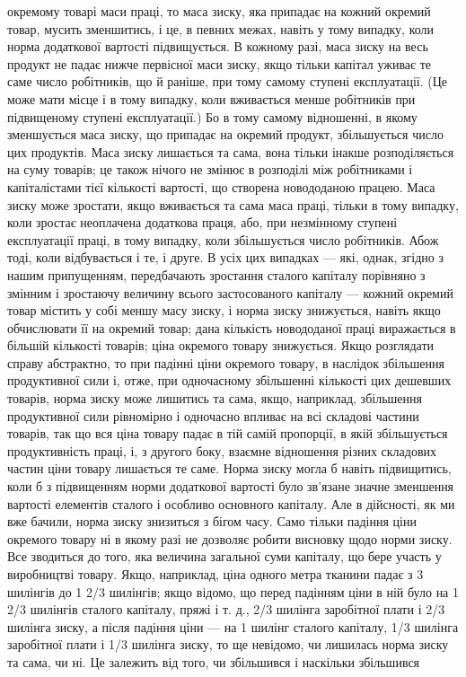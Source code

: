 \parcont{}  %
окремому товарі маси праці, то маса зиску, яка припадає на кожний окремий товар, мусить зменшитись,
і це, в певних межах, навіть у тому випадку, коли норма додаткової вартості підвищується. В кожному
разі, маса зиску на весь продукт не падає нижче первісної маси зиску, якщо тільки капітал уживає те
саме число робітників, що й раніше, при тому самому ступені експлуатації. (Це може мати місце і в
тому випадку, коли вживається менше робітників при підвищеному ступені експлуатації.) Бо в тому
самому відношенні, в якому зменшується маса зиску, що припадає на окремий продукт, збільшується
число цих продуктів. Маса зиску лишається та сама, вона тільки інакше розподіляється на суму
товарів; це також нічого не змінює в розподілі між робітниками і капіталістами тієї кількості
вартості, що створена новододаною працею. Маса зиску може зростати, якщо вживається та сама маса
праці, тільки в тому випадку, коли зростає неоплачена додаткова праця, або, при незмінному ступені
експлуатації праці, в тому випадку, коли збільшується число робітників. Абож тоді, коли відбувається
і те, і друге. В усіх цих випадках — які, однак, згідно з нашим припущенням, передбачають зростання
сталого капіталу порівняно з змінним і зростаючу величину всього застосованого капіталу — кожний
окремий товар містить у собі меншу масу зиску, і норма зиску знижується, навіть якщо обчислювати її
на окремий товар; дана кількість новододаної праці виражається в більшій кількості товарів; ціна
окремого товару знижується. Якщо
розглядати справу абстрактно, то при падінні ціни окремого товару, в наслідок збільшення
продуктивної сили і, отже, при одночасному збільшенні кількості цих дешевших товарів, норма зиску
може лишитись та сама, якщо, наприклад, збільшення продуктивної сили рівномірно і одночасно впливає
на всі складові частини товарів, так що вся ціна товару падає в тій самій пропорції, в якій
збільшується продуктивність праці, і, з другого боку, взаємне відношення різних складових частин
ціни товару лишається те саме. Норма зиску могла б навіть підвищитись, коли б з підвищенням норми
додаткової вартості було зв’язане значне зменшення вартості елементів сталого і особливо основного
капіталу. Але в дійсності, як ми вже бачили, норма зиску знизиться з бігом часу. Само тільки падіння
ціни окремого товару ні в якому разі не дозволяє робити висновку щодо норми зиску. Все зводиться до
того, яка величина загальної суми капіталу, що бере участь у виробництві товару. Якщо, наприклад,
ціна одного метра тканини падає з 3 шилінгів до 1 2/3 шилінгів; якщо відомо, що перед падінням ціни
в ній було на 1 2/3 шилінгів сталого капіталу, пряжі і т. д., 2/3 шилінга заробітної плати і 2/3
шилінга зиску, а після падіння ціни — на 1 шилінг сталого капіталу, 1/3 шилінга заробітної плати і
1/3 шилінга зиску, то ще невідомо, чи лишилась норма зиску та сама, чи ні. Це залежить від того, чи
збільшився і наскільки збільшився
\parbreak{}  %
